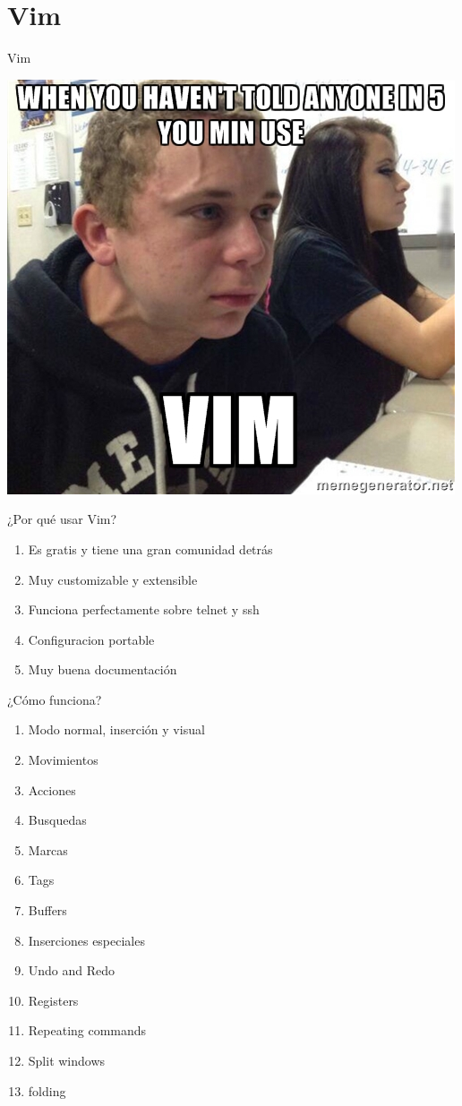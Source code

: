 \documentclass{beamer}
\begin{document}
\section{Vim}
\begin{frame}{Vim}
    \begin{center}
    \includegraphics[height=\paperheight]{vimaddict}
    \end{center}
\end{frame}
\begin{frame}{¿Por qué usar Vim?}
  \begin{enumerate}
  \item Es gratis y tiene una gran comunidad detrás
  \item Muy customizable y extensible
  \item Funciona perfectamente sobre telnet y ssh
  \item Configuracion portable
  \item Muy buena documentación
  \end{enumerate}
\end{frame}

\begin{frame}{¿Cómo funciona?}
  \begin{enumerate}
  \item Modo normal, inserción y visual
  \item Movimientos
  \item Acciones
  \item Busquedas
  \item Marcas
  \item Tags
  \item Buffers
  \item Inserciones especiales
  \item Undo and Redo
  \item Registers
  \item Repeating commands
  \item Split windows
  \item folding
  \end{enumerate}
\end{frame}
\end{document}
